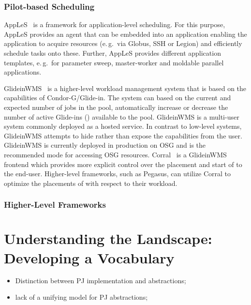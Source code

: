\documentclass{sig-alternate}
\begin{document}
\subsubsection{Pilot-based Scheduling}
AppLeS~\cite{Berman:2003:ACG:766629.766632} is a framework for 
application-level scheduling. For this purpose, AppLeS provides an agent that 
can be embedded into an application enabling the application to acquire 
resources (e.\,g.\ via Globus, SSH or Legion) and efficiently schedule tasks 
onto these. Further, AppLeS provides different application templates,
e.\,g.\ for parameter sweep, master-worker and moldable parallel applications.


GlideinWMS~\cite{1742-6596-119-6-062044} is a higher-level workload management
system that is based on the \pilot capabilities of Condor-G/Glide-in. The
system can based on the current and expected number of jobs in the pool,
automatically increase or decrease the number of active Glide-ins (\pilots)
available to the pool. GlideinWMS is a multi-user \pilotjob system commonly
deployed as a hosted service. In contrast to low-level \pilotjob systems,
GlideinWMS attempts to hide rather than expose the \pilot capabilities from
the user. GlideinWMS is currently deployed in production on OSG and is the
recommended mode for accessing OSG resources. 
Corral~\cite{Rynge:2011:EUG:2116259.2116599} is a GlideinWMS frontend 
which provides more explicit control over the placement and start of \pilots 
to the end-user. Higher-level frameworks, such as Pegasus, can utilize Corral 
to optimize the placements of \pilots with respect to their workload.


\subsubsection{Higher-Level Frameworks}


\section{Understanding the Landscape: Developing a Vocabulary}


\begin{itemize}
	\item Distinction between PJ implementation and abstractions;
        \item lack of a unifying model for PJ abstractions;
\end{itemize}
\end{document}
